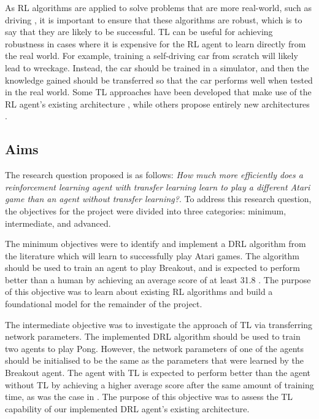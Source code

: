 \documentclass[12pt,a4paper]{article}
\begin{document}
As RL algorithms are applied to solve problems that are more real-world, such as driving \cite{DBLP:journals/corr/YouPWL17}, it is important to ensure that these algorithms are robust, which is to say that they are likely to be successful. TL can be useful for achieving robustness in cases where it is expensive for the RL agent to learn directly from the real world. For example, training a self-driving car from scratch will likely lead to wreckage. Instead, the car should be trained in a simulator, and then the knowledge gained should be transferred so that the car performs well when tested in the real world. Some TL approaches have been developed that make use of the RL agent's existing architecture \cite{parisotto2016actormimic}, while others propose entirely new architectures \cite{DBLP:journals/corr/RusuRDSKKPH16}.

\subsection{Aims}
The research question proposed is as follows: \textit{How much more efficiently does a reinforcement learning agent with transfer learning learn to play a different Atari game than an agent without transfer learning?}. To address this research question, the objectives for the project were divided into three categories: minimum, intermediate, and advanced. 

The minimum objectives were to identify and implement a DRL algorithm from the literature which will learn to successfully play Atari games. The algorithm should be used to train an agent to play Breakout, and is expected to perform better than a human by achieving an average score of at least 31.8 \cite{Mnih2015}. The purpose of this objective was to learn about existing RL algorithms and build a foundational model for the remainder of the project.

The intermediate objective was to investigate the approach of TL via transferring network parameters. The implemented DRL algorithm should be used to train two agents to play Pong. However, the network parameters of one of the agents should be initialised to be the same as the parameters that were learned by the Breakout agent. The agent with TL is expected to perform better than the agent without TL by achieving a higher average score after the same amount of training time, as was the case in \cite{parisotto2016actormimic}. The purpose of this objective was to assess the TL capability of our implemented DRL agent's existing architecture. 
\end{document}
